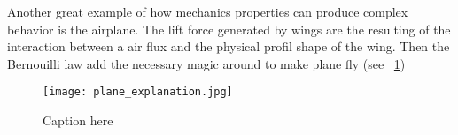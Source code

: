 






Another great example of how mechanics properties can produce complex behavior is the airplane.
The lift force generated by wings are the resulting of the interaction between a air flux and the physical profil shape of the wing.
Then the Bernouilli law add the necessary magic around to make plane fly (see \figurename~\ref{fig:magic_plane})

\begin{figure}[tb]
    \begin{center}
        \texttt{[image: plane\_explanation.jpg]}
    \end{center}
    \caption{Caption here}
    \label{fig:magic_plane}
\end{figure}

